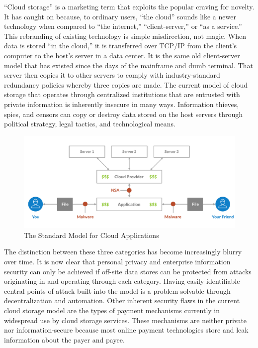 \documentclass[a4paper,10pt]{article}
\begin{document}
“Cloud storage” is a marketing term that exploits the popular craving for novelty. It has caught on because, to ordinary users, “the cloud” sounds like a newer technology when compared to “the internet,” “client-server,” or “as a service.” This rebranding of existing technology is simple misdirection, not magic.  When data is stored “in the cloud,” it is transferred over TCP/IP from the client’s computer to the host’s server in a data center.  It is the same old client-server model that has existed since the days of the mainframe and dumb terminal. That server then copies it to other servers to comply with industry-standard redundancy policies whereby three copies are made. The current model of cloud storage that operates through centralized institutions that are entrusted with private information is inherently insecure in many ways.  Information thieves, spies, and censors can copy or destroy data stored on the host servers through political strategy, legal tactics, and technological means. \\

\begin{figure}[h!]
  \centering
      \includegraphics[width=\linewidth]{01}
  \caption{The Standard Model for Cloud Applications}
\end{figure}

The distinction between these three categories has become increasingly blurry over time. It is now clear that personal privacy and enterprise information security can only be achieved if off-site data stores can be protected from attacks originating in and operating through each category.  Having easily identifiable central points of attack built into the model is a problem solvable through decentralization and automation. Other inherent security flaws in the current cloud storage model are the types of payment mechanisms currently in widespread use by cloud storage services. These mechanisms are neither private nor information-secure because most online payment technologies store and leak information about the payer and payee.\\
\end{document}
